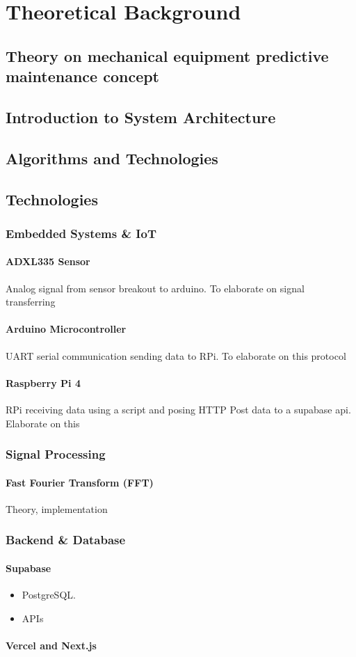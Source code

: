 \chapter{Theoretical Background}
\label{chap2}

\section{Theory on mechanical equipment predictive maintenance concept}

\section{Introduction to System Architecture}

\section{Algorithms and Technologies}

\section{Technologies}
\subsection{Embedded Systems \& IoT}
\subsubsection{ADXL335 Sensor}
Analog signal from sensor breakout to arduino. To elaborate on signal transferring
\subsubsection{Arduino Microcontroller}
UART serial communication sending data to RPi. To elaborate on this protocol
\subsubsection{Raspberry Pi 4}
RPi receiving data using a script and posing HTTP Post data to a supabase api. Elaborate on this


\subsection{Signal Processing}
\subsubsection{Fast Fourier Transform (FFT)}
Theory, implementation

\subsection{Backend \& Database}
\subsubsection{Supabase}
\begin{itemize}  
	\item PostgreSQL. 
	\item APIs
\end{itemize}  
\subsubsection{Vercel and Next.js}


